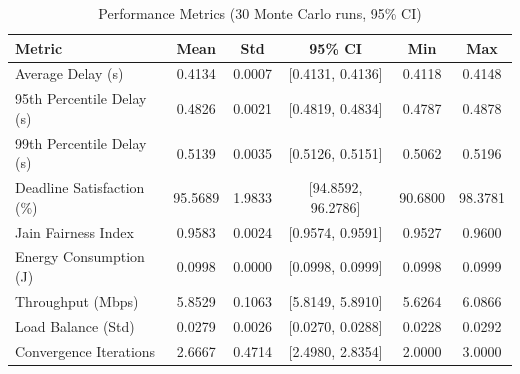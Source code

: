 \begin{table}[htb]
\centering
\caption{Performance Metrics (30 Monte Carlo runs, 95\% CI)}
\label{tab:main}
\begin{tabular}{lccccc}
\toprule
\textbf{Metric} & \textbf{Mean} & \textbf{Std} & \textbf{95\% CI} & \textbf{Min} & \textbf{Max} \\
\midrule
Average Delay (s) & 0.4134 & 0.0007 & [0.4131, 0.4136] & 0.4118 & 0.4148 \\
95th Percentile Delay (s) & 0.4826 & 0.0021 & [0.4819, 0.4834] & 0.4787 & 0.4878 \\
99th Percentile Delay (s) & 0.5139 & 0.0035 & [0.5126, 0.5151] & 0.5062 & 0.5196 \\
Deadline Satisfaction (\%) & 95.5689 & 1.9833 & [94.8592, 96.2786] & 90.6800 & 98.3781 \\
Jain Fairness Index & 0.9583 & 0.0024 & [0.9574, 0.9591] & 0.9527 & 0.9600 \\
Energy Consumption (J) & 0.0998 & 0.0000 & [0.0998, 0.0999] & 0.0998 & 0.0999 \\
Throughput (Mbps) & 5.8529 & 0.1063 & [5.8149, 5.8910] & 5.6264 & 6.0866 \\
Load Balance (Std) & 0.0279 & 0.0026 & [0.0270, 0.0288] & 0.0228 & 0.0292 \\
Convergence Iterations & 2.6667 & 0.4714 & [2.4980, 2.8354] & 2.0000 & 3.0000 \\
\bottomrule
\end{tabular}
\end{table}
